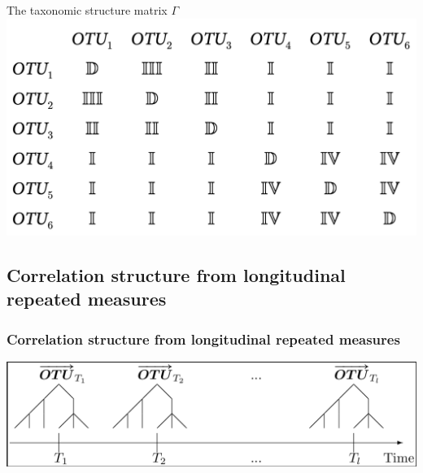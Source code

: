 \documentclass{beamer}
\begin{document}
\begin{frame}[t]{The taxonomic structure matrix $\Gamma$}
  \includegraphics[width = \textwidth]{Gamma.png}
\end{frame}

\subsection{Correlation structure from longitudinal repeated measures}

\begin{frame}
\frametitle{Correlation structure from longitudinal repeated measures}

\includegraphics[width = \textwidth]{otu_time_tree.png}

\end{frame}
\end{document}
